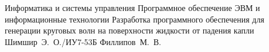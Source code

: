 \documentclass{bmstu}
\begin{document}
\renewcommand{\thelstlisting}{\arabic{lstlisting}}

\makecourseworktitle
    {Информатика и системы управления}
    {Программное обеспечение ЭВМ и информационные технологии}
    {Разработка программного обеспечения для генерации круговых волн на поверхности жидкости от
    падения капли}
    {Шимшир~Э.~О./ИУ7-53Б}
    {Филлипов~М.~В.}
    {}

\maketableofcontents

 
 
 
 





\makebibliography
\end{document}
